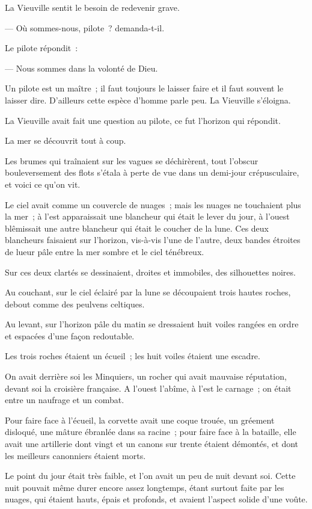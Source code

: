 \documentclass[french,twoside]{book} %
\begin{document}
La Vieuville sentit le besoin de redevenir grave.\par
— Où sommes-nous, pilote ? demanda-t-il.\par
Le pilote répondit :\par
— Nous sommes dans la volonté de Dieu.\par
Un pilote est un maître ; il faut toujours le laisser  faire et il faut souvent le laisser dire. D’ailleurs cette espèce d’homme parle peu. La Vieuville s’éloigna.\par
La Vieuville avait fait une question au pilote, ce fut l’horizon qui répondit.\par
La mer se découvrit tout à coup.\par
Les brumes qui traînaient sur les vagues se déchirèrent, tout l’obscur bouleversement des flots s’étala à perte de vue dans un demi-jour crépusculaire, et voici ce qu’on vit.\par
Le ciel avait comme un couvercle de nuages ; mais les nuages ne touchaient plus la mer ; à l’est apparaissait une blancheur qui était le lever du jour, à l’ouest blêmissait une autre blancheur qui était le coucher de la lune. Ces deux blancheurs faisaient sur l’horizon, vis-à-vis l’une de l’autre, deux bandes étroites de lueur pâle entre la mer sombre et le ciel ténébreux.\par
Sur ces deux clartés se dessinaient, droites et immobiles, des silhouettes noires.\par
Au couchant, sur le ciel éclairé par la lune se découpaient trois hautes roches, debout comme des peulvens celtiques.\par
Au levant, sur l’horizon pâle du matin se dressaient huit voiles rangées en ordre et espacées d’une façon redoutable.\par
Les trois roches étaient un écueil ; les huit voiles étaient une escadre.\par
On avait derrière soi les Minquiers, un rocher qui avait mauvaise réputation, devant soi la croisière française. A l’ouest l’abîme, à l’est le carnage ; on était entre un naufrage et un combat.\par
 Pour faire face à l’écueil, la corvette avait une coque trouée, un gréement disloqué, une mâture ébranlée dans sa racine ; pour faire face à la bataille, elle avait une artillerie dont vingt et un canons sur trente étaient démontés, et dont les meilleurs canonniers étaient morts.\par
Le point du jour était très faible, et l’on avait un peu de nuit devant soi. Cette nuit pouvait même durer encore assez longtemps, étant surtout faite par les nuages, qui étaient hauts, épais et profonds, et avaient l’aspect solide d’une voûte.\par
\end{document}
